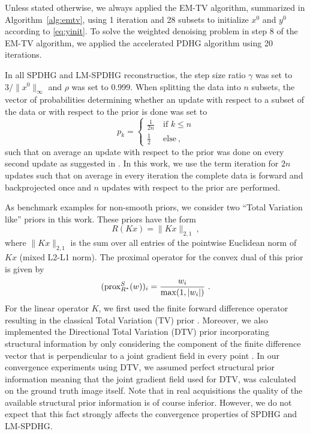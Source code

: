 Unless stated otherwise, we always applied the EM-TV algorithm, summarized in Algorithm~\ref{alg:emtv}, 
using 1 iteration and 28 subsets to initialize $x^0$ and $y^0$ according to \eqref{eq:yinit}.
To solve the weighted denoising problem in step 8 of the EM-TV algorithm, we applied the
accelerated PDHG algorithm \cite{Chambolle2011} using 20 iterations.

In all SPDHG and LM-SPDHG reconstructios, the step size ratio $\gamma$ was set 
to $3 / \|x^0\|_\infty$ and $\rho$ was set to 0.999.
When splitting the data into $n$ subsets, the vector of probabilities determining 
whether an update with respect to a subset of the data or with respect to the prior is 
done was set to 
%
\begin{equation}
p_k = 
  \begin{cases}
  \frac{1}{2n} \ &\text{if } k \leq n \\
  \frac{1}{2}  \ &\text{else} \ ,
  \end{cases}
\end{equation}
%
such that on average an update with respect to the prior was done on every second update
as suggested in \cite{Ehrhardt2019}. 
In this work, we use the term iteration for $2n$ updates such that on average in every iteration
the complete data is forward and backprojected once and $n$ updates with respect to the
prior are performed.

As benchmark examples for non-smooth priors, we consider two ``Total Variation like'' priors
in this work. 
These priors have the form
%
\begin{equation}
  R(Kx) = \|K x\|_{2,1} \ ,
\end{equation}
%
where $\|K x \|_{2,1}$ is the sum over all entries of the pointwise Euclidean norm of $K x$
(mixed L2-L1 norm).
The proximal operator for the convex dual of this prior is given by
%
\begin{equation}
(\operatorname{prox}_{R^*}^S(w) )_i = \frac{w_i}{\max(1,|w_i|)} \ .
\end{equation}
%
For the linear operator $K$, we first used the finite forward difference operator resulting
in the classical Total Variation (TV) prior \cite{Rudin1992}.
Moreover, we also implemented the Directional Total Variation (DTV) prior incorporating
structural information by only considering the component of the finite difference vector 
that is perpendicular to a joint gradient field in every point \cite{Ehrhardt2016}.
In our convergence experiments using DTV, we assumed perfect structural prior information
meaning that the joint gradient field used for DTV, was calculated on the ground truth image
itself.
Note that in real acquisitions the quality of the available structural prior information is
of course inferior. 
However, we do not expect that this fact strongly affects the convergence properties of 
SPDHG and LM-SPDHG. 

